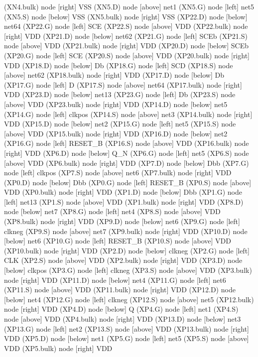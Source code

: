 \begin{circuitikz}[american]
	(XN4.bulk) node [right]	{VSS}
	(XN5.D) node [above]	{net1}
	(XN5.G) node [left]	{net5}
	(XN5.S) node [below]	{VSS}
	(XN5.bulk) node [right]	{VSS}
	(XP22.D) node [below]	{net64}
	(XP22.G) node [left]	{SCE}
	(XP22.S) node [above]	{VDD}
	(XP22.bulk) node [right]	{VDD}
	(XP21.D) node [below]	{net62}
	(XP21.G) node [left]	{SCEb}
	(XP21.S) node [above]	{VDD}
	(XP21.bulk) node [right]	{VDD}
	(XP20.D) node [below]	{SCEb}
	(XP20.G) node [left]	{SCE}
	(XP20.S) node [above]	{VDD}
	(XP20.bulk) node [right]	{VDD}
	(XP18.D) node [below]	{Db}
	(XP18.G) node [left]	{SCD}
	(XP18.S) node [above]	{net62}
	(XP18.bulk) node [right]	{VDD}
	(XP17.D) node [below]	{Db}
	(XP17.G) node [left]	{D}
	(XP17.S) node [above]	{net64}
	(XP17.bulk) node [right]	{VDD}
	(XP23.D) node [below]	{net13}
	(XP23.G) node [left]	{Db}
	(XP23.S) node [above]	{VDD}
	(XP23.bulk) node [right]	{VDD}
	(XP14.D) node [below]	{net5}
	(XP14.G) node [left]	{clkpos}
	(XP14.S) node [above]	{net3}
	(XP14.bulk) node [right]	{VDD}
	(XP15.D) node [below]	{net2}
	(XP15.G) node [left]	{net5}
	(XP15.S) node [above]	{VDD}
	(XP15.bulk) node [right]	{VDD}
	(XP16.D) node [below]	{net2}
	(XP16.G) node [left]	{RESET\_B}
	(XP16.S) node [above]	{VDD}
	(XP16.bulk) node [right]	{VDD}
	(XP6.D) node [below]	{Q\_N}
	(XP6.G) node [left]	{net5}
	(XP6.S) node [above]	{VDD}
	(XP6.bulk) node [right]	{VDD}
	(XP7.D) node [below]	{Dbb}
	(XP7.G) node [left]	{clkpos}
	(XP7.S) node [above]	{net6}
	(XP7.bulk) node [right]	{VDD}
	(XP0.D) node [below]	{Dbb}
	(XP0.G) node [left]	{RESET\_B}
	(XP0.S) node [above]	{VDD}
	(XP0.bulk) node [right]	{VDD}
	(XP1.D) node [below]	{Dbb}
	(XP1.G) node [left]	{net13}
	(XP1.S) node [above]	{VDD}
	(XP1.bulk) node [right]	{VDD}
	(XP8.D) node [below]	{net7}
	(XP8.G) node [left]	{net4}
	(XP8.S) node [above]	{VDD}
	(XP8.bulk) node [right]	{VDD}
	(XP9.D) node [below]	{net6}
	(XP9.G) node [left]	{clkneg}
	(XP9.S) node [above]	{net7}
	(XP9.bulk) node [right]	{VDD}
	(XP10.D) node [below]	{net6}
	(XP10.G) node [left]	{RESET\_B}
	(XP10.S) node [above]	{VDD}
	(XP10.bulk) node [right]	{VDD}
	(XP2.D) node [below]	{clkneg}
	(XP2.G) node [left]	{CLK}
	(XP2.S) node [above]	{VDD}
	(XP2.bulk) node [right]	{VDD}
	(XP3.D) node [below]	{clkpos}
	(XP3.G) node [left]	{clkneg}
	(XP3.S) node [above]	{VDD}
	(XP3.bulk) node [right]	{VDD}
	(XP11.D) node [below]	{net4}
	(XP11.G) node [left]	{net6}
	(XP11.S) node [above]	{VDD}
	(XP11.bulk) node [right]	{VDD}
	(XP12.D) node [below]	{net4}
	(XP12.G) node [left]	{clkneg}
	(XP12.S) node [above]	{net5}
	(XP12.bulk) node [right]	{VDD}
	(XP4.D) node [below]	{Q}
	(XP4.G) node [left]	{net1}
	(XP4.S) node [above]	{VDD}
	(XP4.bulk) node [right]	{VDD}
	(XP13.D) node [below]	{net3}
	(XP13.G) node [left]	{net2}
	(XP13.S) node [above]	{VDD}
	(XP13.bulk) node [right]	{VDD}
	(XP5.D) node [below]	{net1}
	(XP5.G) node [left]	{net5}
	(XP5.S) node [above]	{VDD}
	(XP5.bulk) node [right]	{VDD}
\fi


\end{circuitikz}
